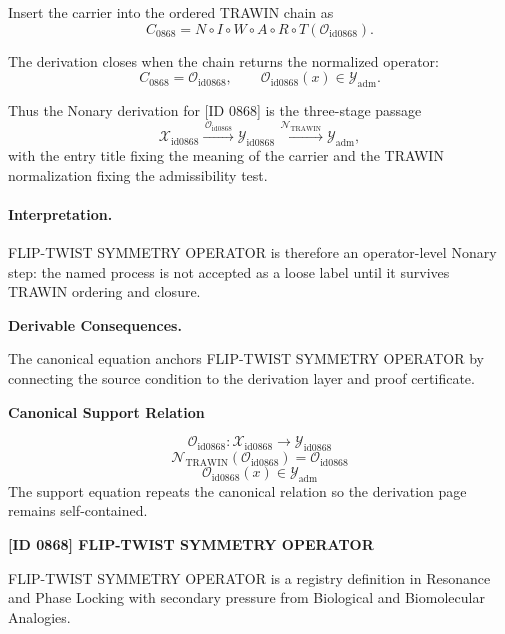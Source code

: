 Insert the carrier into the ordered TRAWIN chain as\[
C_{0868}=N\circ I\circ W\circ A\circ R\circ T(\mathcal{O}_{\mathrm{id0868}}).
\]

The derivation closes when the chain returns the normalized operator:\[
C_{0868}=\mathcal{O}_{\mathrm{id0868}},\qquad \mathcal{O}_{\mathrm{id0868}}(x)\in\mathcal{Y}_{\mathrm{adm}}.
\]

Thus the Nonary derivation for [ID 0868] is the three-stage passage
\[
\mathcal{X}_{\mathrm{id0868}}\xrightarrow{\,\mathcal{O}_{\mathrm{id0868}}\,} \mathcal{Y}_{\mathrm{id0868}}\xrightarrow{\,\mathcal{N}_{\mathrm{TRAWIN}}\,} \mathcal{Y}_{\mathrm{adm}},
\]
with the entry title fixing the meaning of the carrier and the TRAWIN normalization fixing the admissibility test.

\paragraph{Interpretation.} FLIP-TWIST SYMMETRY OPERATOR is therefore an operator-level Nonary step: the named process is not accepted as a loose label until it survives TRAWIN ordering and closure.

\par\vspace{0.35em}
\noindent\textbf{Derivable Consequences.}\quad
\begingroup
\footnotesize
\raggedright
The canonical equation anchors FLIP-TWIST SYMMETRY OPERATOR by connecting the source condition to the derivation layer and proof certificate.
\par\endgroup

\noindent\textbf{Canonical Support Relation}\par
\[
\mathcal{O}_{\mathrm{id0868}}:\mathcal{X}_{\mathrm{id0868}}\longrightarrow\mathcal{Y}_{\mathrm{id0868}}
\]
\[
\mathcal{N}_{\mathrm{TRAWIN}}(\mathcal{O}_{\mathrm{id0868}})=\mathcal{O}_{\mathrm{id0868}}
\]
\[
\mathcal{O}_{\mathrm{id0868}}(x)\in\mathcal{Y}_{\mathrm{adm}}
\]
\noindent The support equation repeats the canonical relation so the derivation page remains self-contained.\par

\clearpage
\noindent\textbf{[ID 0868] FLIP-TWIST SYMMETRY OPERATOR}\par
\vspace{0.35em}
\begingroup\small
{}
FLIP-TWIST SYMMETRY OPERATOR is a registry definition in Resonance and Phase Locking with secondary pressure from Biological and Biomolecular Analogies.

